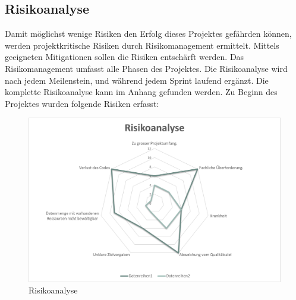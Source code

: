 \subsection{Risikoanalyse}
Damit möglichst wenige Risiken den Erfolg dieses Projektes gefährden können, werden projektkritische Risiken durch Risikomanagement ermittelt. Mittels geeigneten Mitigationen sollen
die Risiken entschärft werden. Das Risikomanagement umfasst alle Phasen des Projektes. Die Risikoanalyse wird nach jedem Meilenstein, und während jedem Sprint laufend ergänzt. Die komplette Risikoanalyse kann im Anhang gefunden werden. Zu Beginn des Projektes wurden folgende Risiken erfasst:

\begin{figure}[htb]
	\centering
	\includegraphics[keepaspectratio,width=\linewidth]{img/Initiale Risikoanalyse.png}
	\caption{Risikoanalyse}
	\label{fig:InitialeRisikoanalyse}
\end{figure}